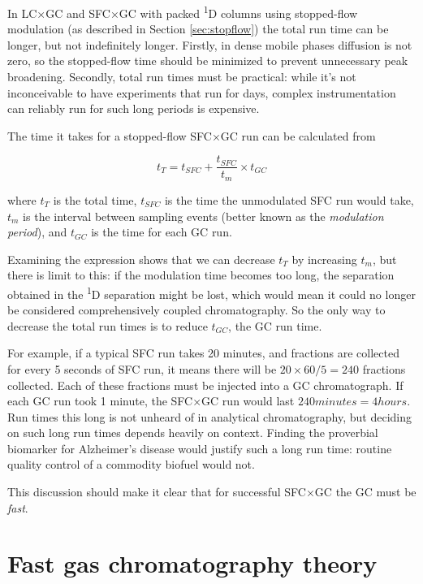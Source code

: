 In LC×GC and SFC×GC with packed \textsuperscript{1}D columns using stopped-flow
modulation (as described in Section \ref{sec:stopflow}) the total run time can
be longer, but not indefinitely longer. Firstly, in dense mobile phases
diffusion is not zero, so the stopped-flow time should be minimized to prevent
unnecessary peak broadening. Secondly, total run times must be practical: while
it's not inconceivable to have experiments that run for days, complex
instrumentation can reliably run for such long periods is expensive.

The time it takes for a stopped-flow SFC×GC run can be calculated from

\[t_{T} = t_{SFC} + \frac{t_{SFC}}{t_{m}} \times t_{GC}\]

where \(t_T\) is the total time, \(t_{SFC}\) is the time the unmodulated SFC run
would take, \(t_m\) is the interval between sampling events (better known as the
\textit{modulation period}), and \(t_{GC}\) is the time for each GC run.

Examining the expression shows that we can decrease \(t_T\) by increasing
\(t_m\), but there is limit to this: if the modulation time becomes too long,
the separation obtained in the \textsuperscript{1}D separation might be lost,
which would mean it could no longer be considered comprehensively coupled
chromatography. So the only way to decrease the total run times is to reduce
\(t_{GC}\), the GC run time.

For example, if a typical SFC run takes 20 minutes, and fractions are collected
for every 5 seconds of SFC run, it means there will be \( 20 \times 60 / 5 = 240
\) fractions collected. Each of these fractions must be injected into a GC
chromatograph. If each GC run took 1 minute, the SFC×GC run would last \(240
minutes = 4 hours\). Run times this long is not unheard of in analytical
chromatography, but deciding on such long run times depends heavily on context.
Finding the proverbial biomarker for Alzheimer's disease would justify such a
long run time: routine quality control of a commodity biofuel would not.

This discussion should make it clear that for successful SFC×GC the GC
must be \textit{fast}.

\section{Fast gas chromatography theory}

